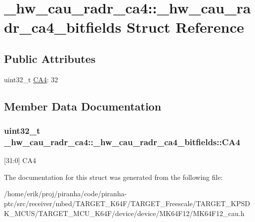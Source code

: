 \hypertarget{struct__hw__cau__radr__ca4_1_1__hw__cau__radr__ca4__bitfields}{}\section{\+\_\+hw\+\_\+cau\+\_\+radr\+\_\+ca4\+:\+:\+\_\+hw\+\_\+cau\+\_\+radr\+\_\+ca4\+\_\+bitfields Struct Reference}
\label{struct__hw__cau__radr__ca4_1_1__hw__cau__radr__ca4__bitfields}
\subsection*{Public Attributes}
\begin{DoxyCompactItemize}
\item 
uint32\+\_\+t \hyperlink{struct__hw__cau__radr__ca4_1_1__hw__cau__radr__ca4__bitfields_a3ec443e70f4f5c5dade62ca75d618c0d}{C\+A4}\+: 32
\end{DoxyCompactItemize}


\subsection{Member Data Documentation}
\subsubsection[{\texorpdfstring{C\+A4}{CA4}}]{\setlength{\rightskip}{0pt plus 5cm}uint32\+\_\+t \+\_\+hw\+\_\+cau\+\_\+radr\+\_\+ca4\+::\+\_\+hw\+\_\+cau\+\_\+radr\+\_\+ca4\+\_\+bitfields\+::\+C\+A4}\hypertarget{struct__hw__cau__radr__ca4_1_1__hw__cau__radr__ca4__bitfields_a3ec443e70f4f5c5dade62ca75d618c0d}{}\label{struct__hw__cau__radr__ca4_1_1__hw__cau__radr__ca4__bitfields_a3ec443e70f4f5c5dade62ca75d618c0d}
\mbox{[}31\+:0\mbox{]} C\+A4 

The documentation for this struct was generated from the following file\+:\begin{DoxyCompactItemize}
\item 
/home/erik/proj/piranha/code/piranha-\/ptc/src/receiver/mbed/\+T\+A\+R\+G\+E\+T\+\_\+\+K64\+F/\+T\+A\+R\+G\+E\+T\+\_\+\+Freescale/\+T\+A\+R\+G\+E\+T\+\_\+\+K\+P\+S\+D\+K\+\_\+\+M\+C\+U\+S/\+T\+A\+R\+G\+E\+T\+\_\+\+M\+C\+U\+\_\+\+K64\+F/device/device/\+M\+K64\+F12/M\+K64\+F12\+\_\+cau.\+h\end{DoxyCompactItemize}
